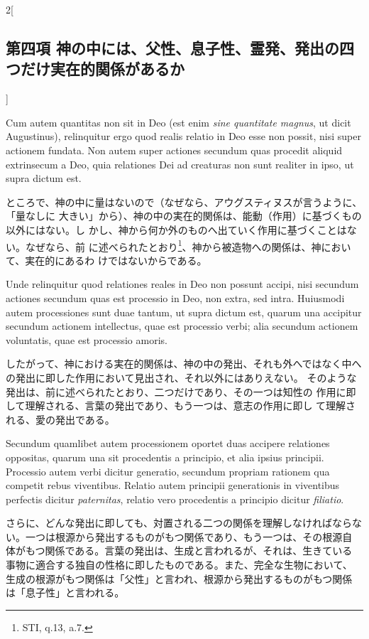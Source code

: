 \documentclass[paper=a4paper,fontsize=10pt,jafontsize=9pt,titlepage]{jlreq}
\begin{document}
\begin{paracol}{2}[\subsection{第四項 神の中には、父性、息子性、霊発、発出の四つだけ実在的関係があるか}]
\switchcolumn*


Cum autem quantitas non sit in Deo (est enim {\itshape sine
quantitate magnus}, ut dicit Augustinus), relinquitur ergo quod realis
relatio in Deo esse non possit, nisi super actionem fundata. Non autem
super actiones secundum quas procedit aliquid extrinsecum a Deo, quia
relationes Dei ad creaturas non sunt realiter in ipso, ut supra dictum
est.


\switchcolumn


ところで、神の中に量はないので（なぜなら、アウグスティヌスが言うように、「量なしに
 大きい」から）、神の中の実在的関係は、能動（作用）に基づくもの以外にはない。し
 かし、神から何か外のものへ出ていく作用に基づくことはない。なぜなら、前
 に述べられたとおり\footnote{STI, q.13, a.7.}、神から被造物への関係は、神において、実在的にあるわ
 けではないからである。


\switchcolumn*


Unde relinquitur quod relationes reales in Deo non possunt accipi,
nisi secundum actiones secundum quas est processio in Deo, non extra,
sed intra. Huiusmodi autem processiones sunt duae tantum, ut supra
dictum est, quarum una accipitur secundum actionem intellectus, quae est
processio verbi; alia secundum actionem voluntatis, quae est processio
amoris.


\switchcolumn


したがって、神における実在的関係は、神の中の発出、それも外へではなく中へ
 の発出に即した作用において見出され、それ以外にはありえない。
そのような発出は、前に述べられたとおり、二つだけであり、その一つは知性の
 作用に即して理解される、言葉の発出であり、もう一つは、意志の作用に即し
 て理解される、愛の発出である。


\switchcolumn*


Secundum quamlibet autem processionem oportet duas accipere
relationes oppositas, quarum una sit procedentis a principio, et alia
ipsius principii. Processio autem verbi dicitur generatio, secundum
propriam rationem qua competit rebus viventibus. Relatio autem principii
generationis in viventibus perfectis dicitur {\itshape paternitas}, relatio vero
procedentis a principio dicitur {\itshape filiatio}.


\switchcolumn


さらに、どんな発出に即しても、対置される二つの関係を理解しなければならな
 い。一つは根源から発出するものがもつ関係であり、もう一つは、その根源自
 体がもつ関係である。言葉の発出は、生成と言われるが、それは、生きている
 事物に適合する独自の性格に即したものである。また、完全な生物において、
 生成の根源がもつ関係は「父性」と言われ、根源から発出するものがもつ関係
 は「息子性」と言われる。



\end{paracol}
\end{document}
